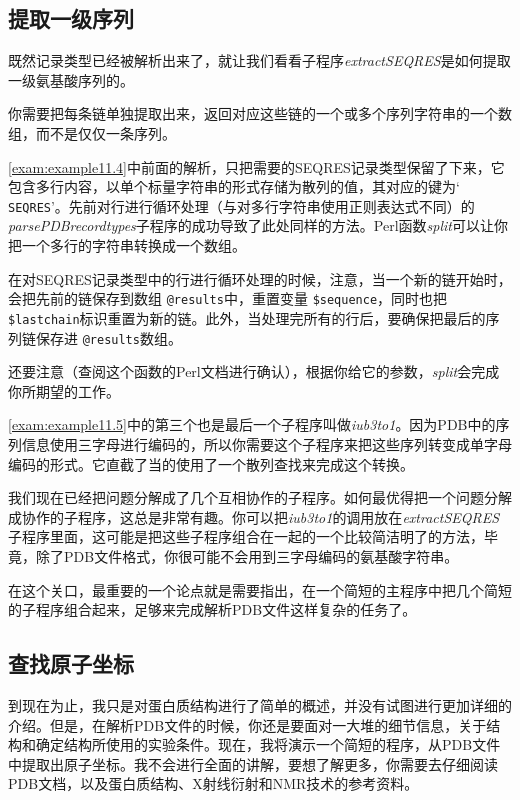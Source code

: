 \subsection{提取一级序列}
既然记录类型已经被解析出来了，就让我们看看子程序\textit{extractSEQRES}是如何提取一级氨基酸序列的。

你需要把每条链单独提取出来，返回对应这些链的一个或多个序列字符串的一个数组，而不是仅仅一条序列。

\autoref{exam:example11.4}中前面的解析，只把需要的SEQRES记录类型保留了下来，它包含多行内容，以单个标量字符串的形式存储为散列的值，其对应的键为` \verb|SEQRES|'。先前对行进行循环处理（与对多行字符串使用正则表达式不同）的\textit{parsePDBrecordtypes}子程序的成功导致了此处同样的方法。Perl函数\textit{split}可以让你把一个多行的字符串转换成一个数组。

在对SEQRES记录类型中的行进行循环处理的时候，注意，当一个新的链开始时，会把先前的链保存到数组 \verb|@results|中，重置变量 \verb|$sequence|，同时也把 \verb|$lastchain|标识重置为新的链。此外，当处理完所有的行后，要确保把最后的序列链保存进 \verb|@results|数组。

还要注意（查阅这个函数的Perl文档进行确认），根据你给它的参数，\textit{split}会完成你所期望的工作。

\autoref{exam:example11.5}中的第三个也是最后一个子程序叫做\textit{iub3to1}。因为PDB中的序列信息使用三字母进行编码的，所以你需要这个子程序来把这些序列转变成单字母编码的形式。它直截了当的使用了一个散列查找来完成这个转换。

我们现在已经把问题分解成了几个互相协作的子程序。如何最优得把一个问题分解成协作的子程序，这总是非常有趣。你可以把\textit{iub3to1}的调用放在\textit{extractSEQRES}子程序里面，这可能是把这些子程序组合在一起的一个比较简洁明了的方法，毕竟，除了PDB文件格式，你很可能不会用到三字母编码的氨基酸字符串。

在这个关口，最重要的一个论点就是需要指出，在一个简短的主程序中把几个简短的子程序组合起来，足够来完成解析PDB文件这样复杂的任务了。

\subsection{查找原子坐标}
到现在为止，我只是对蛋白质结构进行了简单的概述，并没有试图进行更加详细的介绍。但是，在解析PDB文件的时候，你还是要面对一大堆的细节信息，关于结构和确定结构所使用的实验条件。现在，我将演示一个简短的程序，从PDB文件中提取出原子坐标。我不会进行全面的讲解，要想了解更多，你需要去仔细阅读PDB文档，以及蛋白质结构、X射线衍射和NMR技术的参考资料。

